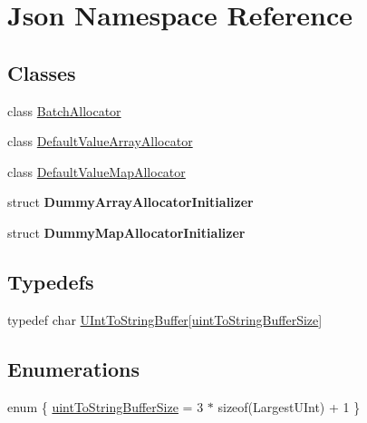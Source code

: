\hypertarget{namespaceJson}{}\section{Json Namespace Reference}
\label{namespaceJson}
\subsection*{Classes}
\begin{DoxyCompactItemize}
\item 
class \hyperlink{classJson_1_1BatchAllocator}{Batch\+Allocator}
\item 
class \hyperlink{classJson_1_1DefaultValueArrayAllocator}{Default\+Value\+Array\+Allocator}
\item 
class \hyperlink{classJson_1_1DefaultValueMapAllocator}{Default\+Value\+Map\+Allocator}
\item 
struct {\bfseries Dummy\+Array\+Allocator\+Initializer}
\item 
struct {\bfseries Dummy\+Map\+Allocator\+Initializer}
\end{DoxyCompactItemize}
\subsection*{Typedefs}
\begin{DoxyCompactItemize}
\item 
typedef char \hyperlink{namespaceJson_a602bcf69c2042fb61c3b243cb16f04ca}{U\+Int\+To\+String\+Buffer}\mbox{[}\hyperlink{namespaceJson_a0c5f614b019f20b4598dcaec09d9e820ae4f2008c7919f20d81286121d1374424}{uint\+To\+String\+Buffer\+Size}\mbox{]}
\end{DoxyCompactItemize}
\subsection*{Enumerations}
\begin{DoxyCompactItemize}
\item 
enum \{ \hyperlink{namespaceJson_a0c5f614b019f20b4598dcaec09d9e820ae4f2008c7919f20d81286121d1374424}{uint\+To\+String\+Buffer\+Size} = 3 $\ast$ sizeof(Largest\+U\+Int) + 1
 \}
\end{DoxyCompactItemize}
